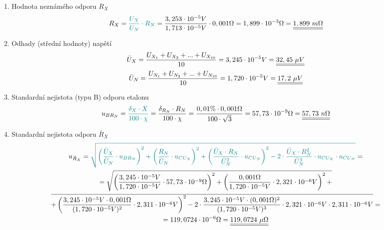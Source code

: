 \documentclass[a4paper, czech]{article}
\begin{document}
\begin{enumerate}
    \item Hodnota neznámého odporu $R_X$
    \begin{multline*}
        R_X = \textcolor{teal}{\frac{U_X}{U_N} \cdot R_N} = \frac{3,253 \cdot 10^{-5} V}{1,713 \cdot 10^{-5} V} \cdot 0,001 \Omega = 1,899 \cdot 10 ^{-3} \Omega = \underline{\underline{1,899\ m\Omega}} \hfill
    \end{multline*}

    \item Odhady (střední hodnoty) napětí
    \begin{multline*}
        \bar{U}_X = \frac{U_{X_1} + U_{X_2} + ... + U_{X_{10}}}{10} = 3,245 \cdot 10^{-5} V = \underline{\underline{32,45\ \mu V}} \hfill
    \end{multline*}
    \begin{multline*}
        \bar{U}_N = \frac{U_{N_1} + U_{N_2} + ... + U_{N_{10}}}{10} = 1,720 \cdot 10^{-5} V = \underline{\underline{17,2\ \mu V}} \hfill
    \end{multline*}

    \item Standardní nejistota (typu B) odporu etalonu
    \begin{multline*}
        u_{BR_N} = \textcolor{teal}{\frac{\delta_X \cdot X}{100 \cdot \chi}} = \frac{\delta_{R_N} \cdot R_N}{100 \cdot \chi} = \frac{0,01\% \cdot 0,001 \Omega}{100 \cdot \sqrt{3}} = 57,73 \cdot 10^{-9} \Omega = \underline{\underline{57,73\ n \Omega}} \hfill
    \end{multline*}

    \item Standardní nejistota odporu $\bar{R}_X$
    \begin{multline*}
        u_{\bar{R}_X} = \textcolor{teal}{\sqrt{\left( \frac{\bar{U}_X}{\bar{U}_N} \cdot u_{BR_N} \right)^2 + \left( \frac{R_N}{\bar{U}_N} \cdot u_{CU_X} \right)^2 + \left( \frac{\bar{U}_X \cdot R_N}{\bar{U}_N^2} \cdot u_{CU_N} \right)^2 - 2 \cdot \frac{\bar{U}_X \cdot R_N^2}{\bar{U}_N^3} \cdot u_{CU_X} \cdot u_{CU_N}}} = \\
        = \sqrt{\left( \frac{3,245 \cdot 10^{-5} V}{1,720 \cdot 10^{-5} V} \cdot 57,73 \cdot 10^{-9} \Omega \right)^2 + \left( \frac{0,001 \Omega}{1,720 \cdot 10^{-5} V} \cdot 2,321 \cdot 10^{-6} V \right)^2 +} \\
        \overline{+ \left( \frac{3,245 \cdot 10^{-5} V \cdot 0,001 \Omega}{(1,720 \cdot 10^{-5} V)^2} \cdot 2,311 \cdot 10^{-6} V \right)^2 - 2 \cdot \frac{3,245 \cdot 10^{-5} V \cdot (0,001 \Omega)^2}{(1,720 \cdot 10^{-5} V)^3} \cdot 2,321 \cdot 10^{-6} V \cdot 2,311 \cdot 10^{-6} V } = \\
        = 119,0724 \cdot 10^{-6} \Omega = \underline{\underline{119,0724\ \mu \Omega}}
    \end{multline*}


\end{enumerate}
\end{document}
